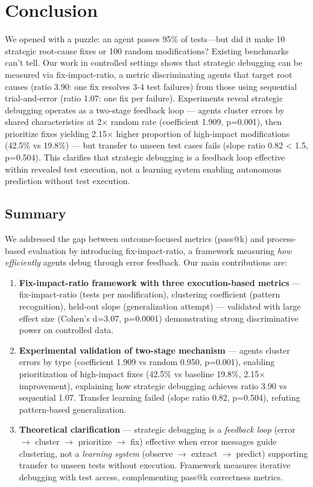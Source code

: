 \section{Conclusion}

We opened with a puzzle: an agent passes 95\% of tests—but did it make 10 strategic root-cause fixes or 100 random modifications? Existing benchmarks can't tell. Our work in controlled settings shows that strategic debugging can be measured via fix-impact-ratio, a metric discriminating agents that target root causes (ratio 3.90: one fix resolves 3-4 test failures) from those using sequential trial-and-error (ratio 1.07: one fix per failure). Experiments reveal strategic debugging operates as a two-stage feedback loop — agents cluster errors by shared characteristics at 2$\times$ random rate (coefficient 1.909, p=0.001), then prioritize fixes yielding 2.15$\times$ higher proportion of high-impact modifications (42.5\% vs 19.8\%) — but transfer to unseen test cases fails (slope ratio 0.82 < 1.5, p=0.504). This clarifies that strategic debugging is a feedback loop effective within revealed test execution, not a learning system enabling autonomous prediction without test execution.

\subsection{Summary}

We addressed the gap between outcome-focused metrics (pass@k) and process-based evaluation by introducing fix-impact-ratio, a framework measuring \emph{how efficiently} agents debug through error feedback. Our main contributions are:

\begin{enumerate}
\item \textbf{Fix-impact-ratio framework with three execution-based metrics} — fix-impact-ratio (tests per modification), clustering coefficient (pattern recognition), held-out slope (generalization attempt) — validated with large effect size (Cohen's d=3.07, p=0.0001) demonstrating strong discriminative power on controlled data.

\item \textbf{Experimental validation of two-stage mechanism} — agents cluster errors by type (coefficient 1.909 vs random 0.950, p=0.001), enabling prioritization of high-impact fixes (42.5\% vs baseline 19.8\%, 2.15$\times$ improvement), explaining how strategic debugging achieves ratio 3.90 vs sequential 1.07. Transfer learning failed (slope ratio 0.82, p=0.504), refuting pattern-based generalization.

\item \textbf{Theoretical clarification} — strategic debugging is a \emph{feedback loop} (error $\rightarrow$ cluster $\rightarrow$ prioritize $\rightarrow$ fix) effective when error messages guide clustering, not a \emph{learning system} (observe $\rightarrow$ extract $\rightarrow$ predict) supporting transfer to unseen tests without execution. Framework measures iterative debugging with test access, complementing pass@k correctness metrics.
\end{enumerate}

